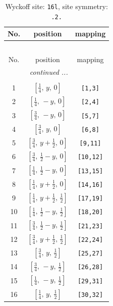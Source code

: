 \documentclass[fleqn,8pt]{jsarticle}
\begin{document}
\renewcommand{\arraystretch}{1.2}
\begin{longtable}{ccc}
\caption{Wyckoff site: {\tt 16l}, site symmetry: {\tt .2.}}
 \\
 \hline \hline
No. & position & mapping \\ \hline \endfirsthead

\multicolumn{2}{l}{\tablename\ \thetable{}} \\
 \hline \hline
No. & position & mapping \\ \hline \endhead

 \hline \hline
\multicolumn{2}{r}{\footnotesize\it continued ...} \\ \endfoot

 \hline \hline
\multicolumn{2}{r}{} \\ \endlastfoot

1 & $\left[ \frac{1}{4},\, y,\, 0 \right]$ & {\tt [1,3]} \\ \hline
2 & $\left[ \frac{1}{4},\, - y,\, 0 \right]$ & {\tt [2,4]} \\ \hline
3 & $\left[ \frac{3}{4},\, - y,\, 0 \right]$ & {\tt [5,7]} \\ \hline
4 & $\left[ \frac{3}{4},\, y,\, 0 \right]$ & {\tt [6,8]} \\ \hline
5 & $\left[ \frac{3}{4},\, y + \frac{1}{2},\, 0 \right]$ & {\tt [9,11]} \\ \hline
6 & $\left[ \frac{3}{4},\, \frac{1}{2} - y,\, 0 \right]$ & {\tt [10,12]} \\ \hline
7 & $\left[ \frac{1}{4},\, \frac{1}{2} - y,\, 0 \right]$ & {\tt [13,15]} \\ \hline
8 & $\left[ \frac{1}{4},\, y + \frac{1}{2},\, 0 \right]$ & {\tt [14,16]} \\ \hline
9 & $\left[ \frac{1}{4},\, y + \frac{1}{2},\, \frac{1}{2} \right]$ & {\tt [17,19]} \\ \hline
10 & $\left[ \frac{1}{4},\, \frac{1}{2} - y,\, \frac{1}{2} \right]$ & {\tt [18,20]} \\ \hline
11 & $\left[ \frac{3}{4},\, \frac{1}{2} - y,\, \frac{1}{2} \right]$ & {\tt [21,23]} \\ \hline
12 & $\left[ \frac{3}{4},\, y + \frac{1}{2},\, \frac{1}{2} \right]$ & {\tt [22,24]} \\ \hline
13 & $\left[ \frac{3}{4},\, y,\, \frac{1}{2} \right]$ & {\tt [25,27]} \\ \hline
14 & $\left[ \frac{3}{4},\, - y,\, \frac{1}{2} \right]$ & {\tt [26,28]} \\ \hline
15 & $\left[ \frac{1}{4},\, - y,\, \frac{1}{2} \right]$ & {\tt [29,31]} \\ \hline
16 & $\left[ \frac{1}{4},\, y,\, \frac{1}{2} \right]$ & {\tt [30,32]} \\
\end{longtable}
\end{document}
